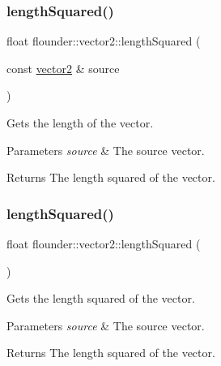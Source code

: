 \subsubsection{\texorpdfstring{length\+Squared()}{lengthSquared()}\hspace{0.1cm}{\footnotesize\ttfamily [1/2]}}
{\footnotesize\ttfamily float flounder\+::vector2\+::length\+Squared (\begin{DoxyParamCaption}\item[{const \hyperlink{classflounder_1_1vector2}{vector2} \&}]{source }\end{DoxyParamCaption})\hspace{0.3cm}{\ttfamily [static]}}



Gets the length of the vector. 


\begin{DoxyParams}{Parameters}
{\em source} & The source vector. \\
\hline
\end{DoxyParams}
\begin{DoxyReturn}{Returns}
The length squared of the vector. 
\end{DoxyReturn}
\mbox{\label{classflounder_1_1vector2_a67c4e72415ec236a166e8627c5d76851}} 
\subsubsection{\texorpdfstring{length\+Squared()}{lengthSquared()}\hspace{0.1cm}{\footnotesize\ttfamily [2/2]}}
{\footnotesize\ttfamily float flounder\+::vector2\+::length\+Squared (\begin{DoxyParamCaption}{ }\end{DoxyParamCaption})}



Gets the length squared of the vector. 


\begin{DoxyParams}{Parameters}
{\em source} & The source vector. \\
\hline
\end{DoxyParams}
\begin{DoxyReturn}{Returns}
The length squared of the vector. 
\end{DoxyReturn}
\mbox{\label{classflounder_1_1vector2_a598ef8a41204d55d897ef53da7fb0fb8}} 
